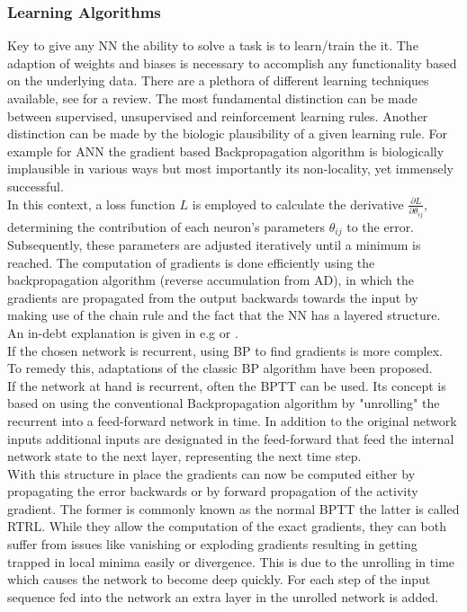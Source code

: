 \subsubsection{Learning Algorithms}
	Key to give any \ac{NN} the ability to solve a task is to learn/train the it. The adaption of weights and biases is necessary to accomplish any functionality based on the underlying data\cite{zheng_introductory_2022}.
	There are a plethora of different learning techniques available, see \cite{abdolrasol_artificial_2021,sun_survey_2019} for a review. The most fundamental distinction can be made between supervised, unsupervised and reinforcement learning rules.
	Another distinction can be made by the biologic plausibility of a given learning rule. For example for \ac{ANN} the gradient based Backpropagation algorithm is biologically implausible in various ways but most importantly its non-locality, yet immensely successful.\\
	In this context, a loss function $L$ is employed to calculate the derivative $\frac{\partial L}{\partial \theta_{ij}}$, determining the contribution of each neuron's parameters $\theta_{ij}$ to the error. Subsequently, these parameters are adjusted iteratively until a minimum is reached. The computation of gradients is done efficiently using the backpropagation algorithm (reverse accumulation from \ac{AD}), in which the gradients are propagated from the output backwards towards the input by making use of the chain rule and the fact that the \ac{NN} has a layered structure. An in-debt explanation is given in e.g \cite{goodfellow_deep_2016} or \cite{nielsen_neural_2015}.\\
	If the chosen network is recurrent, using \ac{BP} to find gradients is more complex.
	To remedy this, adaptations of the classic \ac{BP} algorithm have been proposed.\\
	If the network at hand is recurrent, often the \ac{BPTT} can be used. Its concept is based on using the conventional Backpropagation algorithm by "unrolling" the recurrent into a feed-forward network in time. In addition to the original network inputs additional inputs are designated in the feed-forward that feed the internal network state to the next layer, representing the next time step.\\
	With this structure in place the gradients can now be computed either by propagating the error backwards or by forward propagation of the activity gradient. The former is commonly known as the normal \ac{BPTT} the latter is called \ac{RTRL}\cite{williams_gradient-based_1995}. While they allow the computation of the exact gradients, they can both suffer from issues like vanishing or exploding gradients \cite{pascanu_difficulty_2013,bengio_learning_1994} resulting in getting trapped in local minima easily or divergence. This is due to the unrolling in time which causes the network to become deep quickly. For each step of the input sequence fed into the network an extra layer in the unrolled network is added.\\
